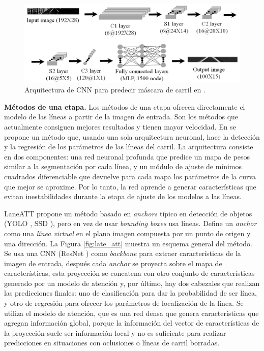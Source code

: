 \documentclass[a4paper, oneside, onecolumn, 11pt]{article}
\begin{document}
\begin{figure} [h!]
    \begin{center}
      \includegraphics[width=\textwidth]{figs/cnn_map.png}
    \end{center}
    \caption{Arquitectura de CNN para predecir máscara de carril en \cite{Kim2014}.}
    \label{fig:cnn_map}
\end{figure}

\noindent\textbf{Métodos de una etapa.} Los métodos de una etapa ofrecen directamente el modelo de las líneas a partir de la imagen de entrada. Son los métodos que actualmente consiguen mejores resultados y tienen mayor velocidad. En \cite{van2019end} se propone un método que, usando una sola arquitectura neuronal, hace la detección y la regresión de los parámetros de las líneas del carril. La arquitectura consiste en dos componentes: una red neuronal profunda que predice un mapa de pesos similar a la segmentación por cada línea, y un módulo de ajuste de mínimos cuadrados diferenciable que devuelve para cada mapa los parámetros de la curva que mejor se aproxime. Por lo tanto, la red aprende a generar características que evitan inestabilidades durante la etapa de ajuste de los modelos a las líneas. 

LaneATT \cite{tabelini2021keep} propone un método basado en \textit{anchors} típico en detección de objetos (YOLO \cite{redmon2016you}, SSD \cite{liu2016ssd}), pero en vez de usar \textit{bounding boxes} usa líneas. Define un \textit{anchor} como una \textit{línea virtual} en el plano imagen compuesta por un punto de origen y una dirección. La Figura \ref{fig:late_att} muestra un esquema general del método. Se usa una CNN (ResNet \cite{he2016deep}) como \textit{backbone} para extraer características de la imagen de entrada, después cada \textit{anchor} se proyecta sobre el mapa de características, esta proyección se concatena con otro conjunto de características generado por un modelo de atención y, por último, hay dos cabezales que realizan las predicciones finales: uno de clasificación para dar la probabilidad de ser línea, y otro de regresión para ofrecer los parámetros de localización de la línea. Se utiliza el modelo de atención, que es una red densa que genera características que agregan información global, porque la información del vector de características de la proyección suele ser información local y no es suficiente para realizar predicciones en situaciones con oclusiones o líneas de carril borradas.
\end{document}
